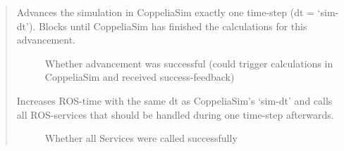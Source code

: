 \documentclass[letterpaper,10pt,english]{sphinxmanual}
\begin{document}
\begin{quote}
\begin{fulllineitems}
\begin{fulllineitems}
\end{fulllineitems}


\begin{fulllineitems}
\label{\detokenize{SimulationSynchronizer:_CPPv2N21coppeliasim_interface22SimulationSynchronizer17advanceSimulationEv}}%
\pysigstartmultiline
{}\label{\detokenize{SimulationSynchronizer:project0classcoppeliasim__interface_1_1SimulationSynchronizer_1a511f8bf3569c7dce3dafb2a6f30dd6f2}}%
\pysigstopmultiline
Advances the simulation in CoppeliaSim exactly one time-step (dt = ‘sim-dt’). Blocks until CoppeliaSim has finished the calculations for this advancement. 

\begin{description}
\item[{}] \leavevmode

Whether advancement was successful (could trigger calculations in CoppeliaSim and received success-feedback) 


\end{description}


\end{fulllineitems}


\begin{fulllineitems}
\label{\detokenize{SimulationSynchronizer:_CPPv2N21coppeliasim_interface22SimulationSynchronizer14synchronizeROSEv}}%
\pysigstartmultiline
{}\label{\detokenize{SimulationSynchronizer:project0classcoppeliasim__interface_1_1SimulationSynchronizer_1a14e5777b6eacdd0a2d95603bad137ea0}}%
\pysigstopmultiline
Increases ROS-time with the same dt as CoppeliaSim’s ‘sim-dt’ and calls all ROS-services that should be handled during one time-step afterwards. 

\begin{description}
\item[{}] \leavevmode

Whether all Services were called successfully 


\end{description}



\end{fulllineitems}
\end{fulllineitems}
\end{quote}
\end{document}
